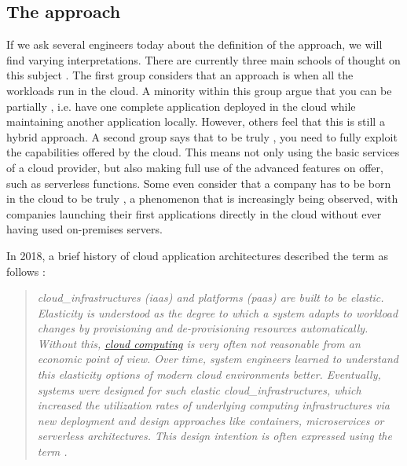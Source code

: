 \subsection{The \texorpdfstring{}{} approach}
If we ask several engineers today about the definition of the  approach, we will find varying interpretations. There are currently three main schools of thought on this subject \cite{history_cloud_native}. The first group considers that an approach is  when all the workloads run in the \gls{cloud}. A minority within this group argue that you can be partially , i.e. have one complete application deployed in the \gls{cloud} while maintaining another application locally. However, others feel that this is still a hybrid approach. A second group says that to be truly , you need to fully exploit the capabilities offered by the \gls{cloud}. This means not only using the basic services of a \gls{cloud} provider, but also making full use of the advanced features on offer, such as serverless functions. Some even consider that a company has to be born in the \gls{cloud} to be truly , a phenomenon that is increasingly being observed, with companies launching their first applications directly in the \gls{cloud} without ever having used on-premises servers. \cite{history_cloud_native}

In 2018, a brief history of \gls{cloud} application architectures described the term  as follows :
\begin{quote}
    \textit{\Glspl{cloud_infrastructure} (\acrshort{iaas}) and platforms (\acrshort{paas}) are built to be elastic. Elasticity is understood as the degree to which a system adapts to workload changes by \gls{provisioning} and de-\gls{provisioning} resources automatically. Without this, \hyperref[subsec:cloudcomputing]{cloud computing} is very often not reasonable from an economic point of view. Over time, system engineers learned to understand this elasticity options of modern \gls{cloud} environments better. Eventually, systems were designed for such elastic \glspl{cloud_infrastructure}, which increased the utilization rates of underlying computing infrastructures via new deployment and design approaches like containers, microservices or serverless architectures. This design intention is often expressed using the term . \cite{history_cloud_application}}
\end{quote}


